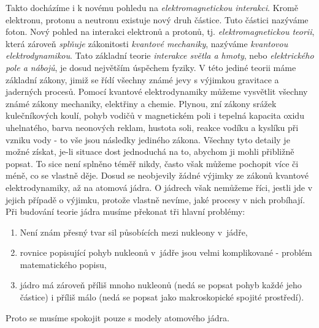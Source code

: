     Takto docházíme i k novému pohledu na \emph{elektromagnetickou interakci}. Kromě elektronu, 
    protonu a neutronu existuje nový druh částice. Tuto částici nazýváme foton. Nový pohled na 
    interakci elektronů a protonů, tj. \emph{elektromagnetickou teorii}, která zároveň 
    \emph{splňuje} zákonitosti \emph{kvantové mechaniky}, nazýváme \emph{kvantovou 
    elektrodynamikou}. Tato základní teorie \emph{interakce světla a hmoty}, nebo 
    \emph{elektrického pole a nábojů}, je dosud největším úspěchem fyziky. V této jediné teorii 
    máme základní zákony, jimiž se řídí všechny známé jevy s výjimkou gravitace a jaderných 
    procesů. Pomocí kvantové elektrodynamiky můžeme vysvětlit všechny známé zákony mechaniky, 
    elektřiny a chemie. Plynou, zní zákony srážek kulečníkových koulí, pohyb vodičů v magnetickém 
    poli i tepelná kapacita oxidu uhelnatého, barva neonových reklam, hustota soli, reakce vodíku a 
    kyslíku při vzniku vody - to vše jsou následky jediného zákona. Všechny tyto detaily je možné 
    získat, je-li situace dost jednoduchá na to, abychom ji mohli přibližně popsat. To sice není 
    splněno téměř nikdy, často však můžeme pochopit více či méně, co se vlastně děje. Dosud se 
    neobjevily žádné výjimky ze zákonů kvantové elektrodynamiky, až na atomová jádra. O jádrech 
    však nemůžeme říci, jestli jde v jejich případě o výjimku, protože vlastně nevíme, jaké procesy 
    v nich probíhají. Při budování teorie jádra musíme překonat tři hlavní problémy:
    \begin{enumerate}[noitemsep]
     \item Není znám přesný tvar sil působících mezi nukleony v jádře,
     \item rovnice popisující pohyb nukleonů v jádře jsou velmi komplikované - problém  
           matematického popisu,
     \item jádro má zároveň příliš mnoho nukleonů (nedá se popsat pohyb každé jeho částice) i    
           příliš málo (nedá se popsat jako makroskopické spojité prostředí).   
    \end{enumerate}
    Proto se musíme spokojit pouze s modely atomového jádra. 
    
